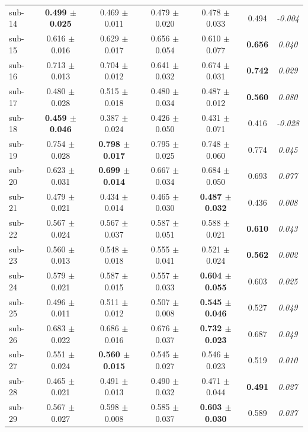 \begin{table}[t]
\begin{tabular}{lcccccc}
sub-14 & \textbf{0.499 $\pm$ 0.025} & 0.469 $\pm$ 0.011 & 0.479 $\pm$ 0.020 & 0.478 $\pm$ 0.033 & 0.494 & \textit{-0.004} \\
sub-15 & 0.616 $\pm$ 0.016 & 0.629 $\pm$ 0.017 & 0.656 $\pm$ 0.054 & 0.610 $\pm$ 0.077 & \textbf{0.656} & \textit{0.040} \\
sub-16 & 0.713 $\pm$ 0.013 & 0.704 $\pm$ 0.012 & 0.641 $\pm$ 0.032 & 0.674 $\pm$ 0.031 & \textbf{0.742} & \textit{0.029} \\
sub-17 & 0.480 $\pm$ 0.028 & 0.515 $\pm$ 0.018 & 0.480 $\pm$ 0.034 & 0.487 $\pm$ 0.012 & \textbf{0.560} & \textit{0.080} \\
sub-18 & \textbf{0.459 $\pm$ 0.046} & 0.387 $\pm$ 0.024 & 0.426 $\pm$ 0.050 & 0.431 $\pm$ 0.071 & 0.416 & \textit{-0.028} \\
sub-19 & 0.754 $\pm$ 0.028 & \textbf{0.798 $\pm$ 0.017} & 0.795 $\pm$ 0.025 & 0.748 $\pm$ 0.060 & 0.774 & \textit{0.045} \\
sub-20 & 0.623 $\pm$ 0.031 & \textbf{0.699 $\pm$ 0.014} & 0.667 $\pm$ 0.034 & 0.684 $\pm$ 0.050 & 0.693 & \textit{0.077} \\
sub-21 & 0.479 $\pm$ 0.021 & 0.434 $\pm$ 0.014 & 0.465 $\pm$ 0.030 & \textbf{0.487 $\pm$ 0.032} & 0.436 & \textit{0.008} \\
sub-22 & 0.567 $\pm$ 0.024 & 0.567 $\pm$ 0.037 & 0.587 $\pm$ 0.051 & 0.588 $\pm$ 0.021 & \textbf{0.610} & \textit{0.043} \\
sub-23 & 0.560 $\pm$ 0.013 & 0.548 $\pm$ 0.018 & 0.555 $\pm$ 0.041 & 0.521 $\pm$ 0.024 & \textbf{0.562} & \textit{0.002} \\
sub-24 & 0.579 $\pm$ 0.021 & 0.587 $\pm$ 0.015 & 0.557 $\pm$ 0.033 & \textbf{0.604 $\pm$ 0.055} & 0.603 & \textit{0.025} \\
sub-25 & 0.496 $\pm$ 0.011 & 0.511 $\pm$ 0.012 & 0.507 $\pm$ 0.008 & \textbf{0.545 $\pm$ 0.046} & 0.527 & \textit{0.049} \\
sub-26 & 0.683 $\pm$ 0.022 & 0.686 $\pm$ 0.016 & 0.676 $\pm$ 0.037 & \textbf{0.732 $\pm$ 0.023} & 0.687 & \textit{0.049} \\
sub-27 & 0.551 $\pm$ 0.024 & \textbf{0.560 $\pm$ 0.015} & 0.545 $\pm$ 0.027 & 0.546 $\pm$ 0.023 & 0.519 & \textit{0.010} \\
sub-28 & 0.465 $\pm$ 0.021 & 0.491 $\pm$ 0.013 & 0.490 $\pm$ 0.032 & 0.471 $\pm$ 0.044 & \textbf{0.491} & \textit{0.027} \\
sub-29 & 0.567 $\pm$ 0.027 & 0.598 $\pm$ 0.008 & 0.585 $\pm$ 0.037 & \textbf{0.603 $\pm$ 0.030} & 0.589 & \textit{0.037} \\

\end{tabular}
\end{table}
